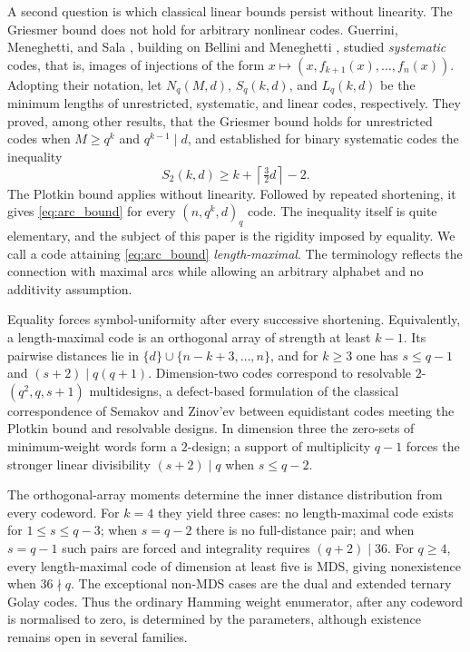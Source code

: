 \documentclass[12pt, letterpaper]{article}
\theoremstyle{plain}
\theoremstyle{definition}
\begin{document}
	A second question is which classical linear bounds persist without linearity. The Griesmer bound does not hold for arbitrary nonlinear codes. Guerrini, Meneghetti, and Sala \cite{Guerrini2015Optimal}, building on Bellini and Meneghetti \cite{Bellini2015Griesmer}, studied \emph{systematic} codes, that is, images of injections of the form $x\mapsto(x,f_{k+1}(x),\ldots,f_n(x))$. Adopting their notation, let $N_q(M,d)$, $S_q(k,d)$, and $L_q(k,d)$ be the minimum lengths of unrestricted, systematic, and linear codes, respectively. They proved, among other results, that the Griesmer bound holds for unrestricted codes when $M\ge q^k$ and $q^{k-1}\mid d$, and established for binary systematic codes the inequality
		\begin{equation}\label{eq:GMS_bound}
		S_2(k,d) \ge k + \left\lceil \tfrac{3}{2}d \right\rceil - 2.
	\end{equation}
	The Plotkin bound applies without linearity. Followed by repeated shortening, it gives \eqref{eq:arc_bound} for every $(n,q^k,d)_q$ code. The inequality itself is quite elementary, and the subject of this paper is the rigidity imposed by equality. We call a code attaining \eqref{eq:arc_bound} \emph{length-maximal}. The terminology reflects the connection with maximal arcs while allowing an arbitrary alphabet and no additivity assumption.
	
	Equality forces symbol-uniformity after every successive shortening. Equivalently, a length-maximal code is an orthogonal array of strength at least $k-1$. Its pairwise distances lie in $\{d\}\cup\{n-k+3,\ldots,n\}$, and for $k\ge3$ one has $s\le q-1$ and $(s+2)\mid q(q+1)$. Dimension-two codes correspond to resolvable $2$-$(q^2,q,s+1)$ multidesigns, a defect-based formulation of the classical correspondence of Semakov and Zinov'ev \cite{SemakovZinoviev1968} between equidistant codes meeting the Plotkin bound and resolvable designs. In dimension three the zero-sets of minimum-weight words form a $2$-design; a support of multiplicity $q-1$ forces the stronger linear divisibility $(s+2)\mid q$ when $s\le q-2$.

	The orthogonal-array moments determine the inner distance distribution from every codeword. For $k=4$ they yield three cases: no length-maximal code exists for $1\le s\le q-3$; when $s=q-2$ there is no full-distance pair; and when $s=q-1$ such pairs are forced and integrality requires $(q+2)\mid36$. For $q\ge4$, every length-maximal code of dimension at least five is MDS, giving nonexistence when $36\nmid q$. The exceptional non-MDS cases are the dual and extended ternary Golay codes. Thus the ordinary Hamming weight enumerator, after any codeword is normalised to zero, is determined by the parameters, although existence remains open in several families.
	
\end{document}
